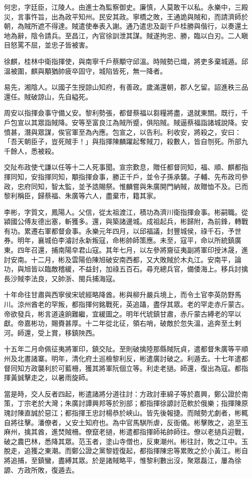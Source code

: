 \begin{pinyinscope}
何忠，字廷臣，江陵人。由進士為監察御史。廉慎，人莫敢干以私。永樂中，三殿災，言事忤旨，出為政平知州。民安其政。寧橋之敗，王通詭與賊和，而請濟師於朝，為賊所遮不得達。賊遣使奉表入謝。通乃遣忠及副千戶桂勝與偕行，以奏還土地為辭，陰令請兵。至昌江，內官徐訓泄其謀。賊遂拘忠、勝，臨以白刃。二人瞋目怒罵不屈，並忠子皆被害。

徐麒，桂林中衛指揮使，與南寧千戶蔡顒守邱溫。時賊勢已熾，將吏多棄城遁。邱溫被圍，麒與顒猶帥疲卒固守，城陷皆死，無一降者。

易先，湘陰人。以國子生授諒山知府，有善政。歲滿還朝，郡人乞留。詔進秩三品還任。賊破諒山，先自縊死。

周安以指揮僉事守備乂安。黎利勢張，都督蔡福以芻糧將盡，退就東關。既行，千戶包宣以其眾詣賊降。安等至富良江為賊所蹙，俱陷賊。賊逼蔡福詣諸城說降。安憤甚，潛與眾謀，俟官軍至為內應。包宣之，以告利。利收安，將殺之，安曰：「吾天朝臣子，豈死賊手！」與指揮陳麟躍起奪賊刀，殺數人，皆自刎死。所部九千餘人，悉被殺。

交阯布政使弋謙以任等十二人死事聞。宣宗歎息，贈任都督同知，福、順、麒都指揮同知，安指揮同知，顒指揮僉事，勝正千戶，並令子孫承襲。子輔、先布政司參政，忠府同知，智太監，並予誥賜祭。惟麟嘗與朱廣開門納賊，故贈恤不及。已而黎利稱臣，歸蔡福、朱廣等六人，盡棄市，籍其家。

李彬，字質文，鳳陽人。父信，從太祖渡江，積功為濟川衛指揮僉事。彬嗣職。從潁國公傅友德出塞，斬獲多。還，與築諸邊城。成祖起兵，彬歸附，為前鋒，轉戰有功。累遷右軍都督僉事。永樂元年四月，以邱福議，封豐城侯，祿千石，予世券。明年，襄城伯李濬討永新叛寇，命彬帥師策應。未至，寇平，命以所統鎮廣東。四年召還，捕南陽皁君山寇。其年七月，以左參將齎征夷副將軍印授沐晟，進討安南。十二月，彬及雲陽伯陳旭破安南西都，又大敗賊於木丸江。安南平，論功，與旭皆以臨敵稽緩，不益封，加祿五百石。尋充總兵官，備倭海上。移兵討擒長沙賊李法良，又帥浙、閩兵捕海寇。

十年命往甘肅與西寧侯宋琥經略降酋。彬與柳升嚴兵境上，而令土官李英防野馬川。涼州酋老的罕叛，都指揮何銘戰死，英追躡，盡俘其眾。老的罕走赤斤蒙古。帝欲發兵，彬言道遠餉難繼，宜緩圖之。明年代琥鎮甘肅，赤斤蒙古縛老的罕以獻。帝嘉彬功，賜賚甚厚。十二年從北征，領右哨，破敵於忽失溫，追奔至土剌河。師還，受上賞，移鎮陜西。

十五年二月命佩征夷將軍印，鎮交阯。至則破擒陸那縣賊阮貞，遣都督朱廣等平順州及北晝諸寨。明年，清化府土巡檢黎利反，彬遣廣討破之。利遁去。十七年遣都督同知方政襲利於可藍柵，獲其將軍阮個立等。利走老撾。師還，復出為寇。都指揮黃誠擊走之，以暑雨旋師。

當是時，交人反者四起，彬遣諸將分道往討：方政討車綿子等於嘉興，鄭公證於南策，丁宗老於大灣；朱廣討譚興邦等於別部；都指揮徐謜討范軟於俄樂；指揮陳原瑰討陳直誠於惡江；都指揮王忠討楊恭於峽山。皆先後報捷。而賊勢尤劇者，彬輒自將往擊。潘僚者，乂安土知府也。為中官馬騏所虐，反衙儀。彬擊敗之，追至玉麻州，擒其酋，進焚賊柵。僚竄老撾，彬遣都指揮師祐帥師往。僚以老撾兵迎戰，破之農巴林，悉降其眾。范玉者，塗山寺僧也，反東潮州。彬往討，敗之江中。玉脫走，追獲之東潮。而鄭公證之黨黎姪復起，都指揮陳忠等累敗之於小黃江。彬自將追捕，至鎮蠻，盡縛其眾。於是諸賊略平，惟黎利數出沒，聚眾磊江，屢為徐謜、方政所敗，復遁去。


\end{pinyinscope}
